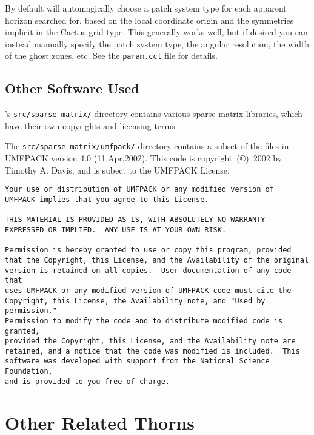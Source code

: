By default  will automagically choose a patch
system type for each apparent horizon searched for, based on the local
coordinate origin and the symmetries implicit in the Cactus grid type.
This generally works well, but if desired you can instead manually
specify the patch system type, the angular resolution, the width of
the ghost zones, etc.  See the \verb|param.ccl| file for details.


\subsection{Other Software Used}

's \verb|src/sparse-matrix/| directory contains
various sparse-matrix libraries, which have their own copyrights and
licensing terms:

The \verb|src/sparse-matrix/umfpack/| directory contains a subset of the
files in UMFPACK version 4.0 (11.Apr.2002).  This code is
copyright~(\copyright)~2002 by Timothy A. Davis, and is subect to the
UMFPACK License:

\begin{verbatim}
Your use or distribution of UMFPACK or any modified version of
UMFPACK implies that you agree to this License.

THIS MATERIAL IS PROVIDED AS IS, WITH ABSOLUTELY NO WARRANTY
EXPRESSED OR IMPLIED.  ANY USE IS AT YOUR OWN RISK.

Permission is hereby granted to use or copy this program, provided
that the Copyright, this License, and the Availability of the original
version is retained on all copies.  User documentation of any code that
uses UMFPACK or any modified version of UMFPACK code must cite the
Copyright, this License, the Availability note, and "Used by permission."
Permission to modify the code and to distribute modified code is granted,
provided the Copyright, this License, and the Availability note are
retained, and a notice that the code was modified is included.  This
software was developed with support from the National Science Foundation,
and is provided to you free of charge.
\end{verbatim}


\section{Other Related Thorns}

